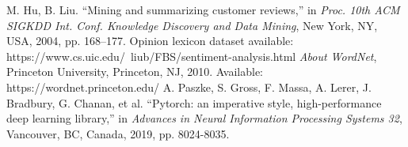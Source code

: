 \documentclass[a4paper]{IEEEtran}
\begin{document}
\begin{thebibliography}{00}
 M. Hu, B. Liu. ``Mining and summarizing customer reviews,'' in \textit{Proc. 10th ACM SIGKDD Int. Conf. Knowledge Discovery and Data Mining}, New York, NY, USA, 2004, pp. 168–177. Opinion lexicon dataset available: https://www.cs.uic.edu/~liub/FBS/sentiment-analysis.html
 \textit{About WordNet}, Princeton University, Princeton, NJ, 2010. Available: https://wordnet.princeton.edu/
 A. Paszke, S. Gross, F. Massa, A. Lerer, J. Bradbury, G. Chanan, et al. ``Pytorch: an imperative style, high-performance deep learning library,'' in \textit{Advances in Neural Information Processing Systems 32}, Vancouver, BC, Canada, 2019, pp. 8024-8035.
\end{thebibliography}
\end{document}
